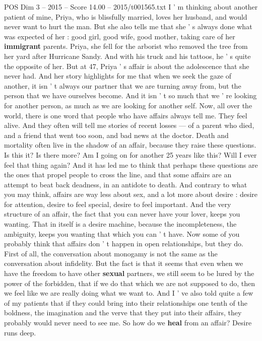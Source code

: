 \begin{textsample}{POS Dim 3 – 2015 – Score 14.00 – 2015/t001565.txt}
I ' m thinking about another patient of mine, Priya, who is blissfully married, loves her husband, and would never want to hurt the man.
But she also tells me that she ' s always done what was expected of her : good girl, good wife, good mother, taking care of her \textbf{immigrant} parents.
Priya, she fell for the arborist who removed the tree from her yard after Hurricane Sandy.
And with his truck and his tattoos, he ' s quite the opposite of her.
But at 47, Priya ' s affair is about the adolescence that she never had.
And her story highlights for me that when we seek the gaze of another, it isn ' t always our partner that we are turning away from, but the person that we have ourselves become.
And it isn ' t so much that we ' re looking for another person, as much as we are looking for another self.
Now, all over the world, there is one word that people who have affairs always tell me.
They feel alive.
And they often will tell me stories of recent losses — of a parent who died, and a friend that went too soon, and bad news at the doctor.
Death and mortality often live in the shadow of an affair, because they raise these questions.
Is this it?
Is there more?
Am I going on for another 25 years like this?
Will I ever feel that thing again?
And it has led me to think that perhaps these questions are the ones that propel people to cross the line, and that some affairs are an attempt to beat back deadness, in an antidote to death.
And contrary to what you may think, affairs are way less about sex, and a lot more about desire : desire for attention, desire to feel special, desire to feel important.
And the very structure of an affair, the fact that you can never have your lover, keeps you wanting.
That in itself is a desire machine, because the incompleteness, the ambiguity, keeps you wanting that which you can ' t have.
Now some of you probably think that affairs don ' t happen in open relationships, but they do.
First of all, the conversation about monogamy is not the same as the conversation about infidelity.
But the fact is that it seems that even when we have the freedom to have other \textbf{sexual} partners, we still seem to be lured by the power of the forbidden, that if we do that which we are not supposed to do, then we feel like we are really doing what we want to.
And I ' ve also told quite a few of my patients that if they could bring into their relationships one tenth of the boldness, the imagination and the verve that they put into their affairs, they probably would never need to see me.
So how do we \textbf{heal} from an affair?
Desire runs deep.

\end{textsample}
